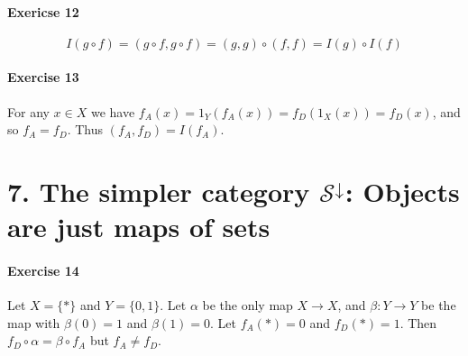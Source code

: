 \documentclass{report}
\begin{document}
    \paragraph{Exericse 12}
    \[ I(g \circ f) = (g \circ f, g \circ f) = (g,g) \circ (f,f) = I(g) \circ I(f) \]

    \paragraph{Exercise 13}
    For any $x \in X$ we have $f_A(x) = 1_Y(f_A(x)) = f_D(1_X(x)) = f_D(x)$, and so $f_A = f_D$.
    Thus $(f_A, f_D) = I(f_A)$.

    \section{7. The simpler category $\mathcal{S}^\downarrow$: Objects are just maps of sets}

    \paragraph{Exercise 14}
    Let $X = \{ * \}$ and $Y = \{ 0, 1 \}$. Let $\alpha$ be the only map $X \rightarrow X$, and
    $\beta : Y \rightarrow Y$ be the map with $\beta(0) = 1$ and $\beta(1) = 0$. Let $f_A(*) = 0$
    and $f_D(*) = 1$. Then $f_D \circ \alpha = \beta \circ f_A$ but $f_A \neq f_D$.
\end{document}
